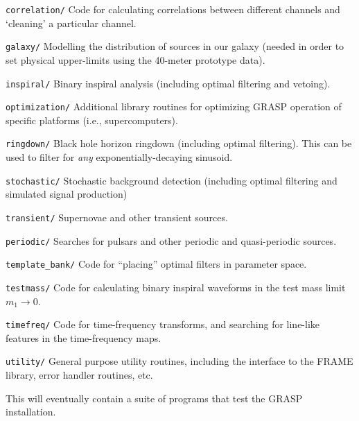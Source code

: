 \begin{description}
\begin{description}
\item{\tt correlation/} Code for calculating correlations between
 different channels and `cleaning' a particular channel. 
\item{\tt galaxy/} Modelling the distribution of sources in our galaxy
(needed in order to set physical upper-limits using the 40-meter
prototype data).
\item{\tt inspiral/}  Binary inspiral analysis (including optimal filtering and
vetoing).
\item{\tt optimization/} Additional library routines for optimizing GRASP operation of specific platforms (i.e., supercomputers).
\item{\tt ringdown/}  Black hole horizon ringdown (including optimal filtering).
  This can be used to filter for {\it any} exponentially-decaying sinusoid.
\item{\tt stochastic/} Stochastic background detection (including optimal filtering and simulated signal production)
\item{\tt transient/}  Supernovae and other transient sources.
\item{\tt periodic/} Searches for pulsars and other periodic and
quasi-periodic sources.
\item{\tt template\_bank/} Code for ``placing'' optimal filters in
parameter space.
\item{\tt testmass/} Code for calculating binary inspiral waveforms in the test mass
limit $m_1 \to 0$.
\item{\tt timefreq/} Code for time-frequency transforms, and searching for line-like
features in the time-frequency maps.
\item{\tt utility/} General purpose utility routines, including the
interface to the FRAME library, error handler routines, etc.
\end{description}
\item[{\tt testing/}] This will eventually contain a suite of programs
that test the GRASP installation.
\end{description}


